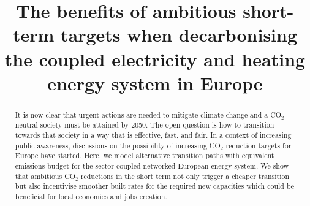 \documentclass[5p]{elsarticle} %
\begin{document}
\begin{frontmatter}

\title{The benefits of ambitious short-term targets when decarbonising the coupled electricity and heating energy system in Europe}




\begin{abstract}

It is now clear that urgent actions are needed to mitigate climate change and a CO$_2$-neutral society must be attained by 2050. The open question is how to transition towards that society in a way that is effective, fast, and fair. In a context of increasing public awareness, discussions on the possibility of increasing CO$_2$ reduction targets for Europe have started. Here, we model alternative transition paths with equivalent emissions budget for the sector-coupled networked European energy system. We show that ambitious CO$_2$ reductions in the short term not only trigger a cheaper transition but also incentivise smoother built rates for the required new capacities which could be beneficial for local economies and jobs creation.

\end{abstract}

\begin{keyword}


\end{keyword}

\end{frontmatter}

\linenumbers
\end{document}
